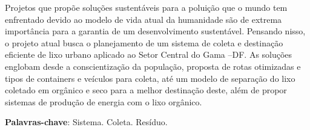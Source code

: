 \begin{resumo}
Projetos que propõe soluções sustentáveis para a poluição que o mundo tem enfrentado devido ao modelo de vida atual da humanidade são de extrema importância para a garantia de um desenvolvimento sustentável. Pensando nisso, o projeto atual busca o planejamento de um sistema de coleta e destinação eficiente de lixo urbano aplicado ao Setor Central do Gama –DF. As soluções englobam desde a conscientização da população, proposta de rotas otimizadas e tipos de containers e veículos para coleta, até um modelo de separação do lixo coletado em orgânico e seco para a melhor destinação deste, além de propor sistemas de produção de energia com o lixo orgânico.

 \vspace{\onelineskip}

 \noindent
 \textbf{Palavras-chave}: Sistema. Coleta. Resíduo.
\end{resumo}
